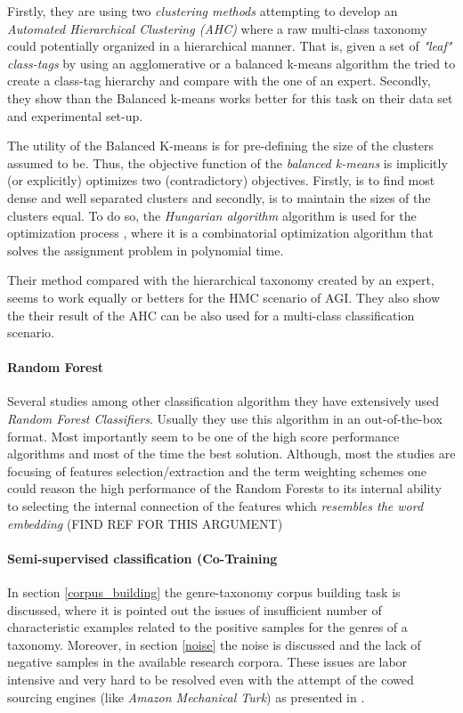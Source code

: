 Firstly, they are using two \textit{clustering methods} attempting to develop an \textit{Automated Hierarchical Clustering (AHC)} where a raw multi-class taxonomy could potentially organized in a hierarchical manner. That is, given a set of  \textit{"leaf" class-tags} by using an agglomerative or a balanced k-means algorithm the tried to create a class-tag hierarchy and compare with the one of an expert. Secondly, they show than the Balanced k-means works better for this task on their data set and experimental set-up.

The utility of the Balanced K-means is for pre-defining the size of the clusters assumed to be. Thus, the objective function of the \textit{balanced k-means} is implicitly (or explicitly) optimizes two (contradictory) objectives. Firstly, is to find most dense and well separated clusters and secondly, is to maintain the sizes of the clusters equal. To do so, the \textit{Hungarian algorithm} algorithm is used for the optimization process \parencite{malinen2014balanced}, where it is a combinatorial optimization algorithm that solves the assignment problem in polynomial time.

Their method compared with the hierarchical taxonomy created by an expert, seems to work equally or betters for the HMC scenario of AGI. They also show the their result of the AHC can be also used for  a multi-class classification scenario.

\paragraph{Random Forest} Several studies among other classification algorithm they have extensively used \textit{Random Forest Classifiers}. Usually they use this algorithm in an out-of-the-box format. Most importantly seem to be one of the high score performance algorithms and most of the time the best solution. Although, most the studies are focusing of features selection/extraction and the term weighting schemes one could reason the high performance of the Random Forests to its internal ability to selecting the internal connection of the  features which \textit{resembles the word embedding} (FIND REF FOR THIS ARGUMENT) \parencite{sugiyanto2014term}

\paragraph{Semi-supervised classification (Co-Training} In section \ref{corpus_building} the genre-taxonomy corpus building task is discussed, where it is pointed out the issues of insufficient number of characteristic examples related to the positive samples for the genres of a taxonomy. Moreover, in section \ref{noise} the noise is discussed and the lack of negative samples in the available research corpora. These issues are labor intensive and very hard to be resolved even with the attempt of the cowed sourcing engines (like \textit{Amazon Mechanical Turk}) as presented in \parencite{Asheghi's relative work}. 

